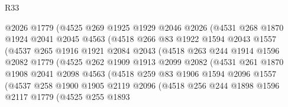 \begin{lexlean}{R33}
\begin{coremodule}
                    @2026
                    @1779
                    (@4525
                      @269
                      @1925
                      @1929
                      @2046
                      @2026
                      (@4531
                        @268
                        @1870
                        @1924
                        @2041
                        @2045
                        @4563
                        (@4518
                          @266
                          @83
                          @1922
                          @1594
                          @2043
                          @1557
                          (@4537
                            @265
                            @1916
                            @1921
                            @2084
                            @2043
                            (@4518
                              @263
                              @244
                              @1914
                              @1596
                              @2082
                              @1779
                              (@4525
                                @262
                                @1909
                                @1913
                                @2099
                                @2082
                                (@4531
                                  @261
                                  @1870
                                  @1908
                                  @2041
                                  @2098
                                  @4563
                                  (@4518
                                    @259
                                    @83
                                    @1906
                                    @1594
                                    @2096
                                    @1557
                                    (@4537
                                      @258
                                      @1900
                                      @1905
                                      @2119
                                      @2096
                                      (@4518
                                        @256
                                        @244
                                        @1898
                                        @1596
                                        @2117
                                        @1779
                                        (@4525
                                          @255
                                          @1893

\end{coremodule}
\end{lexlean}
